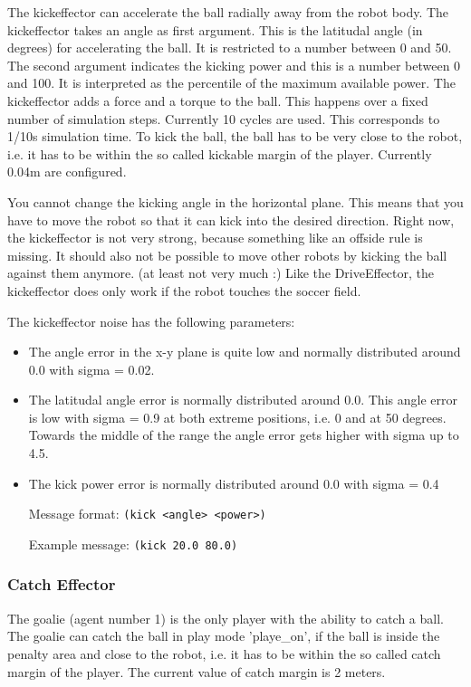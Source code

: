 The kickeffector can accelerate the ball radially away from the robot
body. The kickeffector takes an angle as first argument. This is the
latitudal angle (in degrees) for accelerating the ball. It is
restricted to a number between 0 and 50. The second argument indicates
the kicking power and this is a number between 0 and 100. It is
interpreted as the percentile of the maximum available power. The
kickeffector adds a force and a torque to the ball. This happens over
a fixed number of simulation steps. Currently 10 cycles are used. This
corresponds to 1/10s simulation time. To kick the ball, the ball has
to be very close to the robot, i.e. it has to be within the so called
kickable margin of the player. Currently 0.04m are configured.

You cannot change the kicking angle in the horizontal plane. This
means that you have to move the robot so that it can kick into the
desired direction. Right now, the kickeffector is not very strong,
because something like an offside rule is missing. It should also not
be possible to move other robots by kicking the ball against them
anymore. (at least not very much :) Like the DriveEffector, the
kickeffector does only work if the robot touches the soccer field.

The kickeffector noise has the following parameters: 
\begin{itemize}
\item The angle error in the x-y plane is quite low and normally distributed
around 0.0 with sigma = 0.02.
\item The latitudal angle error is normally distributed around 0.0. This
angle error is low with sigma = 0.9 at both extreme positions, i.e. 0
and at 50 degrees. Towards the middle of the range the angle error
gets higher with sigma up to 4.5.
\item The kick power error is normally distributed around 0.0 with sigma =
0.4
\end{itemize}

\begin{itemize}
	\item[Message format:] \texttt{(kick <angle> <power>)}
	\item[Example message:] \texttt{(kick 20.0 80.0)}
\end{itemize}

\subsubsection{Catch Effector}
The goalie (agent number 1) is the only player with the ability to
catch a ball. The goalie can catch the ball in play mode 'playe\_on',
if the ball is inside the penalty area and close to the robot, i.e. it
has to be within the so called catch margin of the player. The current
value of catch margin is 2 meters.

